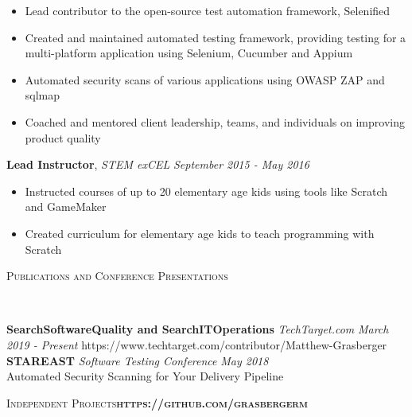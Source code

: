 \documentclass[9pt]{article}
\newenvironment{changemargin}[2]{%
  \begin{list}{}{%
    \setlength{\topsep}{0pt}%
    \setlength{\leftmargin}{#1}%
    \setlength{\rightmargin}{#2}%
    \setlength{\listparindent}{\parindent}%
    \setlength{\itemindent}{\parindent}%
    \setlength{\parsep}{\parskip}%
  }%
  \item[]}{\end{list}
}
\newcommand{\lineover}{
	\begin{changemargin}{-0.05in}{-0.05in}
		\vspace*{-8pt}
		\hrulefill \\
		\vspace*{-2pt}
	\end{changemargin}
}
\newcommand{\header}[1]{
	\begin{changemargin}{-0.5in}{-0.5in}
		\scshape{#1}\\
  	\lineover
	\end{changemargin}
}
\newenvironment{body} {
	\vspace*{-10pt}
	\begin{changemargin}{-0.25in}{-0.5in}
  }	
	{\end{changemargin}
}
\begin{document}
\begin{body}
	\vspace*{-4pt}
	\begin{itemize} \itemsep -0pt  %
		\item  Lead contributor to the open-source test automation framework, Selenified
		\item  Created and maintained automated testing framework, providing testing for a multi-platform application using Selenium, Cucumber and Appium
		\item  Automated security scans of various applications using OWASP ZAP and sqlmap
		\item  Coached and mentored client leadership, teams, and individuals on improving product quality
	\end{itemize}
	
	\textbf{Lead Instructor}, \emph{STEM exCEL} \hfill \emph{September 2015 - May 2016}\\
	\vspace*{-4pt}
	\begin{itemize} \itemsep -0pt  %
		\item  Instructed courses of up to 20 elementary age kids using tools like Scratch and GameMaker
		\item  Created curriculum for elementary age kids to teach programming with Scratch 
	\end{itemize}		
	
\end{body}
\vspace{10pt}	
\smallskip
\header{Publications and Conference Presentations}

\begin{body}
	\vspace{14pt}
        \textbf{SearchSoftwareQuality and SearchITOperations }\emph{TechTarget.com} \hfill \emph{March 2019 - Present}{} https://www.techtarget.com/contributor/Matthew-Grasberger \\
	\smallskip
	\vspace{4pt}
	\textbf{STAREAST }\emph{Software Testing Conference} \hfill \emph{May 2018}{} \\
	Automated Security Scanning for Your Delivery Pipeline
	\vspace{4pt}
\end{body}
\vspace{10pt}
\smallskip
\header{Independent Projects\hfill \textbf{https://github.com/grasbergerm}}
\end{document}

